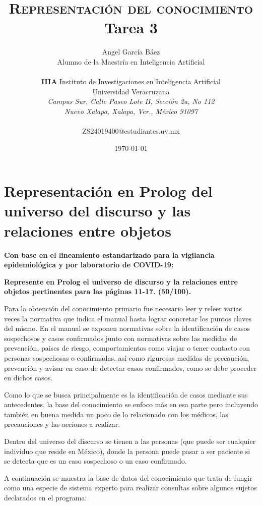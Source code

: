 \documentclass[11pt, letterpaper]{article}
\title{\textsc{Representación del conocimiento} \\
	Tarea 3
}
\author{Angel García Báez\\
	Alumno de la Maestría en Inteligencia Artificial \\ \\ \textbf{IIIA}
	Instituto de Investigaciones en Inteligencia Artificial \\
	Universidad Veracruzana \\ \emph{Campus Sur, Calle Paseo Lote II,
		Sección 2a, No 112} \\ \emph{Nuevo Xalapa, Xalapa, Ver., México 91097}
	\\ \\ ZS24019400@estudiantes.uv.mx}
\date{\today}
\begin{document}
	
\maketitle

\newpage
	
\section{Representación en Prolog del universo del discurso y las relaciones entre objetos}
	
\textbf{Con base en el lineamiento estandarizado para la vigilancia epidemiológica y
por laboratorio de COVID-19:}
	
\textbf{Represente en Prolog el universo de discurso y la relaciones entre objetos
pertinentes para las páginas 11-17. (50/100).}  

Para la obtención del conocimiento primario fue necesario leer y releer varias veces la normativa que indica el manual hasta lograr concretar los puntos claves del mismo.
En el manual se exponen normativas sobre la identificación de casos sospechosos y casos confirmados junto con normativas sobre las medidas de prevención, paises de riesgo, comportamientos como viajar o tener contacto con personas sospechosas o confirmadas, así como rigurosas medidas de precaución, prevención y avisar en caso de detectar casos confirmados, como se debe proceder en dichos casos.

Como lo que se busca principalmente es la identificación de casos mediante sus antecedentes, la base del conocimiento se enfoco más en esa parte pero incluyendo también en buena medida un poco de lo relacionado con los médicos, las precauciones y  las acciones a realizar.

Dentro del universo del discurso se tienen a las personas (que puede ser cualquier individuo que reside en México), donde la persona puede pasar a ser paciente si se detecta que es un caso sospechoso o un caso confirmado.

A continuación se muestra la base de datos del conocimiento que trata de fungir como una especie de sistema experto para realizar consultas sobre algunos sujetos declarados en el programa:
\end{document}

